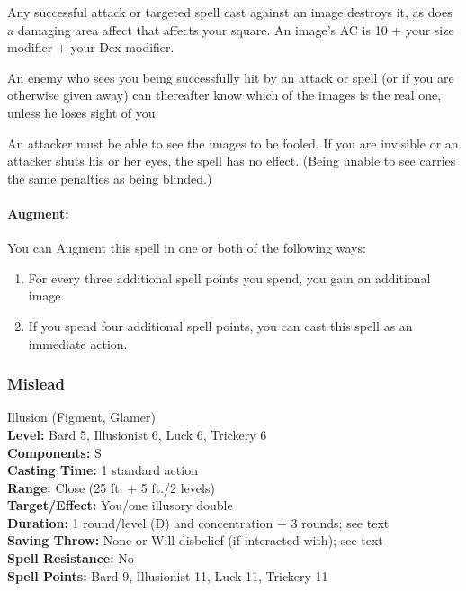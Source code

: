 Any successful attack or targeted spell cast against an image destroys it, as does a damaging area affect that affects your square. 
An image's AC is 10 + your size modifier + your Dex modifier.

An enemy who sees you being successfully hit by an attack or spell (or if you are otherwise given away) can thereafter know which of the images is the real one, unless he loses sight of you.

An attacker must be able to see the images to be fooled. If you are invisible or an attacker shuts his or her eyes, the spell has no effect. (Being unable to see carries the same penalties as being blinded.)

\paragraph{Augment:} You can Augment this spell in one or both of the following ways:
\begin{enumerate}
 \item For every three additional spell points you spend, you gain an additional image.
 \item If you spend four additional spell points, you can cast this spell as an immediate action.
\end{enumerate}
\subsubsection{Mislead}
\label{Spell:Mislead}
Illusion (Figment, Glamer)
\\ \textbf{Level:} Bard 5, Illusionist 6, Luck 6, Trickery 6
\\ \textbf{Components:} S
\\ \textbf{Casting Time:} 1 standard action
\\ \textbf{Range:} Close (25 ft. + 5 ft./2 levels)
\\ \textbf{Target/Effect:} You/one illusory double
\\ \textbf{Duration:} 1 round/level (D) and concentration + 3 rounds; see text
\\ \textbf{Saving Throw:} None or Will disbelief (if interacted with); see text
\\ \textbf{Spell Resistance:} No
\\ \textbf{Spell Points:} Bard 9, Illusionist 11, Luck 11, Trickery 11

